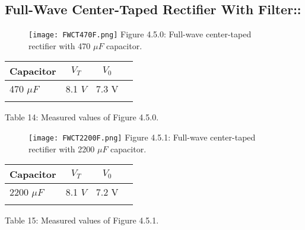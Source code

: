 \subsection{Full-Wave Center-Taped Rectifier With Filter::}

\begin{figure}[H]
\texttt{[image: FWCT470F.png]}
\centering \linebreak \linebreak Figure 4.5.0: Full-wave center-taped rectifier with 470 $\mu F$ capacitor.
\end{figure}

\begin{multicols}{2}
\begin{center}
\begin{tabular}[.5cm]{l c c c}
\toprule
Capacitor & $V_{T}$ & $V_{0}$ \\
\midrule
470 $\mu F$ & 8.1 $V$ &  7.3 V \\
\bottomrule
\linebreak
\end{tabular}
\centering \linebreak Table 14: Measured values of Figure 4.5.0.
\end{center} \hfill

\end{multicols}

\begin{figure}[H]
\texttt{[image: FWCT2200F.png]}
\centering \linebreak \linebreak Figure 4.5.1: Full-wave center-taped rectifier with 2200 $\mu F$ capacitor.
\end{figure}

\begin{multicols}{2}
\begin{center}
\begin{tabular}[.5cm]{l c c c}
\toprule
Capacitor & $V_{T}$ & $V_{0}$ \\
\midrule
2200 $\mu F$ & 8.1 $V$ &  7.2 V \\
\bottomrule
\linebreak
\end{tabular}
\centering \linebreak Table 15: Measured values of Figure 4.5.1.
\end{center} \hfill

\end{multicols}

\pagebreak

